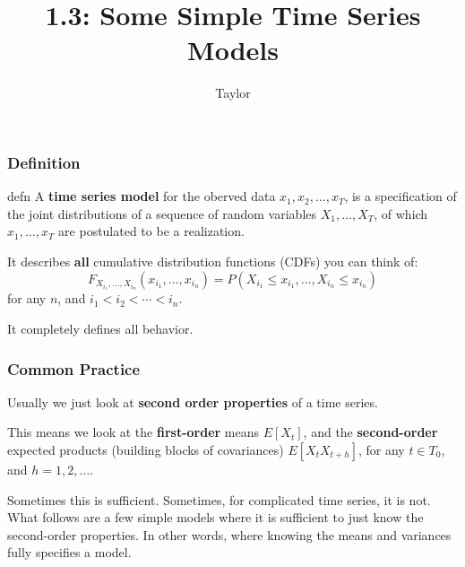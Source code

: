 \documentclass{beamer}
\title["1.3"]{1.3: Some Simple Time Series Models}
\author{Taylor}
\institute[UVA] 
{
University of Virginia \\
\medskip
\textit{} 
}
\date{}
\begin{document}

\begin{frame}
\titlepage 
\end{frame}

\begin{frame}
\frametitle{Definition}

\begin{block}{defn}
A {\bf time series model} for the oberved data $x_1, x_2, \ldots, x_T$, is a specification of the joint distributions of a sequence of random variables $X_1, \ldots, X_T$, of which $x_1, \ldots, x_T$ are postulated to be a realization.
\end{block}


It describes {\bf all} cumulative distribution functions (CDFs) you can think of:
\[
F_{X_{i_1}, \ldots, X_{i_n}}(x_{i_1}, \ldots, x_{i_n}) = P(X_{i_1} \le x_{i_1}, \ldots, X_{i_n} \le x_{i_n})
\] for any $n$, and $i_1 < i_2 < \cdots < i_n$.
\newline

It completely defines all behavior.


\end{frame}


\begin{frame}
\frametitle{Common Practice}

Usually we just look at {\bf second order properties} of a time series. 
\newline

This means we look at the 
{\bf first-order} means $E[X_t]$, and the {\bf second-order} expected products (building blocks of covariances) $E[X_tX_{t+h}]$, for any $t \in T_0$, and $h=1,2,\ldots$.
\newline

Sometimes this is sufficient. Sometimes, for complicated time series, it is not. What follows are a few simple models where it is sufficient to just know the second-order properties. In other words, where knowing the means and variances fully specifies a model.

\end{frame}

\end{document}
